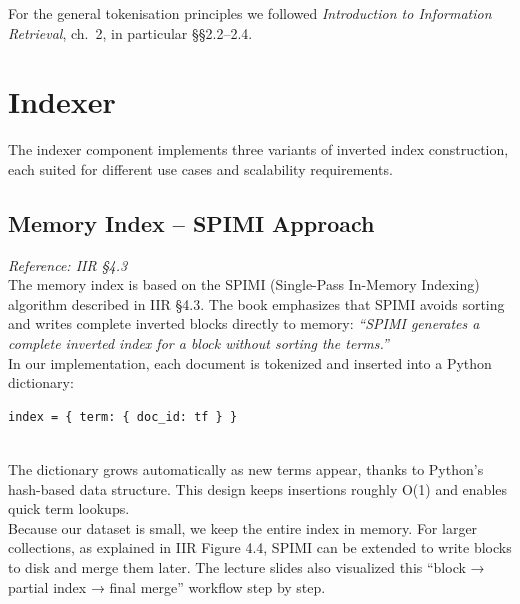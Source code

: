 \documentclass[11pt,a4paper]{article}
\begin{document}
\medskip
\noindent For the general tokenisation principles we followed \emph{Introduction to Information Retrieval}, ch.~2, in particular §§2.2--2.4.

\newpage
\section{Indexer}
\label{sec:indexer}

The indexer component implements three variants of inverted index construction, each suited for different use cases and scalability requirements.

\subsection{Memory Index – SPIMI Approach}
\label{subsec:memory}
\textit{Reference: IIR §4.3}
\\
The memory index is based on the SPIMI (Single-Pass In-Memory Indexing) algorithm described in IIR §4.3.  
The book emphasizes that SPIMI avoids sorting and writes complete inverted blocks directly to memory:  
\textit{“SPIMI generates a complete inverted index for a block without sorting the terms.”}
\\
In our implementation, each document is tokenized and inserted into a Python dictionary:
\begin{verbatim}
index = { term: { doc_id: tf } }
\end{verbatim}
\\
The dictionary grows automatically as new terms appear, thanks to Python’s hash-based data structure.
This design keeps insertions roughly O(1) and enables quick term lookups.
\\
Because our dataset is small, we keep the entire index in memory.
For larger collections, as explained in IIR Figure 4.4, SPIMI can be extended to write blocks to disk and merge them later.  
The lecture slides also visualized this “block → partial index → final merge” workflow step by step.
\end{document}
